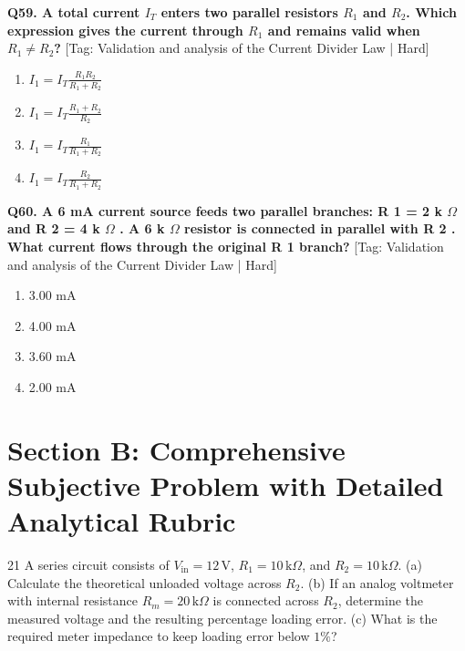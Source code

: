 \noindent\textbf{Q59. A total current $I_T$ enters two parallel resistors $R_1$ and $R_2$. Which expression gives the current through $R_1$ and remains valid when $R_1 \neq R_2$?} \hfill [Tag: Validation and analysis of the Current Divider Law | Hard]
\begin{enumerate}[label=(\alph*),topsep=2pt,itemsep=1pt,partopsep=0pt,parsep=0pt]
    \item {$I_1 = I_T \frac{R_1 R_2}{R_1 + R_2}$}
    \item {$I_1 = I_T \frac{R_1 + R_2}{R_2}$}
    \item {$I_1 = I_T \frac{R_1}{R_1 + R_2}$}
    \item {$I_1 = I_T \frac{R_2}{R_1 + R_2}$}
\end{enumerate}
\vspace{2mm}

\noindent\textbf{Q60. A 6 mA current source feeds two parallel branches: R 1 = 2 k $\Omega$ and R 2 = 4 k $\Omega$ . A 6 k $\Omega$ resistor is connected in parallel with R 2 . What current flows through the original R 1 branch?} \hfill [Tag: Validation and analysis of the Current Divider Law | Hard]
\begin{enumerate}[label=(\alph*),topsep=2pt,itemsep=1pt,partopsep=0pt,parsep=0pt]
    \item {3.00 mA}
    \item {4.00 mA}
    \item {3.60 mA}
    \item {2.00 mA}
\end{enumerate}
\vspace{2mm}


\newpage
\section{Section B: Comprehensive Subjective Problem with Detailed Analytical Rubric}

\begin{subjectiveq}{2}{1}
A series circuit consists of $V_{\mathrm{in}} = 12\,\mathrm{V}$, $R_1 = 10\,\mathrm{k}\Omega$, and $R_2 = 10\,\mathrm{k}\Omega$. (a) Calculate the theoretical unloaded voltage across $R_2$. (b) If an analog voltmeter with internal resistance $R_m = 20\,\mathrm{k}\Omega$ is connected across $R_2$, determine the measured voltage and the resulting percentage loading error. (c) What is the required meter impedance to keep loading error below $1\%$?
\end{subjectiveq}


